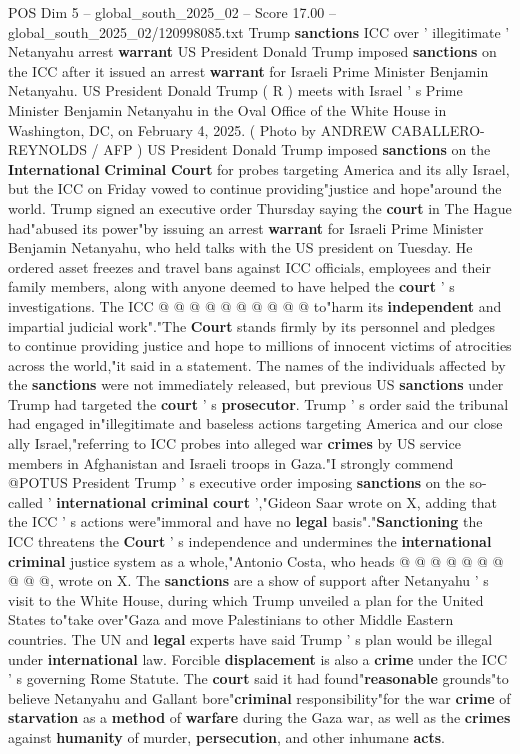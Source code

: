 \begin{textsample}{POS Dim 5 – global\_south\_2025\_02 – Score 17.00 – global\_south\_2025\_02/120998085.txt}  \label{ex:f5_pos_144}
Trump \textbf{sanctions} ICC over ' illegitimate ' Netanyahu arrest \textbf{warrant} US President Donald Trump imposed \textbf{sanctions} on the ICC after it issued an arrest \textbf{warrant} for Israeli Prime Minister Benjamin Netanyahu.
US President Donald Trump ( R ) meets with Israel ' s Prime Minister Benjamin Netanyahu in the Oval Office of the White House in Washington, DC, on February 4, 2025. ( Photo by ANDREW CABALLERO-REYNOLDS / AFP ) US President Donald Trump imposed \textbf{sanctions} on the \textbf{International} \textbf{Criminal} \textbf{Court} for probes targeting America and its ally Israel, but the ICC on Friday vowed to continue providing"justice and hope"around the world.
Trump signed an executive order Thursday saying the \textbf{court} in The Hague had"abused its power"by issuing an arrest \textbf{warrant} for Israeli Prime Minister Benjamin Netanyahu, who held talks with the US president on Tuesday.
He ordered asset freezes and travel bans against ICC officials, employees and their family members, along with anyone deemed to have helped the \textbf{court} ' s investigations.
The ICC @ @ @ @ @ @ @ @ @ @ to"harm its \textbf{independent} and impartial judicial work"."The \textbf{Court} stands firmly by its personnel and pledges to continue providing justice and hope to millions of innocent victims of atrocities across the world,"it said in a statement.
The names of the individuals affected by the \textbf{sanctions} were not immediately released, but previous US \textbf{sanctions} under Trump had targeted the \textbf{court} ' s \textbf{prosecutor}.
Trump ' s order said the tribunal had engaged in"illegitimate and baseless actions targeting America and our close ally Israel,"referring to ICC probes into alleged war \textbf{crimes} by US service members in Afghanistan and Israeli troops in Gaza."I strongly commend @POTUS President Trump ' s executive order imposing \textbf{sanctions} on the so-called ' \textbf{international} \textbf{criminal} \textbf{court} ',"Gideon Saar wrote on X, adding that the ICC ' s actions were"immoral and have no \textbf{legal} basis"."\textbf{Sanctioning} the ICC threatens the \textbf{Court} ' s independence and undermines the \textbf{international} \textbf{criminal} justice system as a whole,"Antonio Costa, who heads @ @ @ @ @ @ @ @ @ @, wrote on X.
The \textbf{sanctions} are a show of support after Netanyahu ' s visit to the White House, during which Trump unveiled a plan for the United States to"take over"Gaza and move Palestinians to other Middle Eastern countries.
The UN and \textbf{legal} experts have said Trump ' s plan would be illegal under \textbf{international} law.
Forcible \textbf{displacement} is also a \textbf{crime} under the ICC ' s governing Rome Statute.
The \textbf{court} said it had found"\textbf{reasonable} grounds"to believe Netanyahu and Gallant bore"\textbf{criminal} responsibility"for the war \textbf{crime} of \textbf{starvation} as a \textbf{method} of \textbf{warfare} during the Gaza war, as well as the \textbf{crimes} against \textbf{humanity} of murder, \textbf{persecution}, and other inhumane \textbf{acts}.


\end{textsample}
